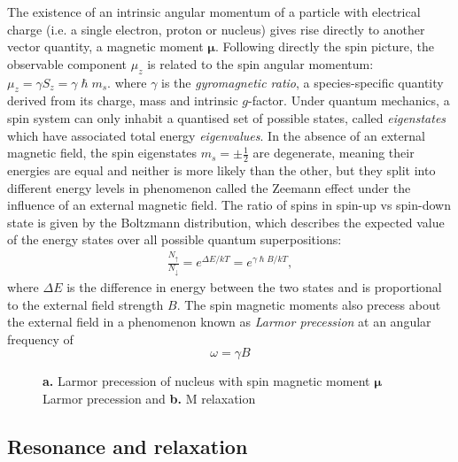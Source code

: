The existence of an intrinsic angular momentum of a particle with electrical charge (i.e. a single electron, proton or nucleus) gives rise directly to another vector quantity, a magnetic moment $\bm{\mu}$.
Following directly the spin picture, the observable component $\mu_z$ is related to the spin angular momentum: $\mu_z = \gamma S_z = \gamma \hslash m_s $.
where $\gamma$ is the \textit{gyromagnetic ratio}, a species-specific quantity derived from its charge, mass and intrinsic $g$-factor.
Under quantum mechanics, a spin system can only inhabit a quantised set of possible states, called \textit{eigenstates} which have associated total energy \textit{eigenvalues}.
In the absence of an external magnetic field, the spin eigenstates $m_s = \pm \frac{1}{2}$ are degenerate, meaning their energies are equal and neither is more likely than the other, but they split into different energy levels in phenomenon called the Zeemann effect under the influence of an external magnetic field.
The ratio of spins in spin-up vs spin-down state is given by the Boltzmann distribution, which describes the expected value of the energy states over all possible quantum superpositions:
\begin{align}
  \frac{N_{\uparrow}}{N_{\downarrow}} = e^{\Delta E / k T} = e^{\gamma \hslash B / k T}, \label{eq:boltzmann}
\end{align}
where $\Delta E$ is the difference in energy between the two states and is proportional to the external field strength $B$.
The spin magnetic moments also precess about the external field in a phenomenon known as \textit{Larmor precession} at an angular frequency of
\begin{equation}
  \omega = \gamma B
\end{equation}

\begin{figure}
    \centering
    \qquad%
    
  \caption{\textbf{a.} Larmor precession of nucleus with spin magnetic moment $\bm{\mu}$ Larmor precession and \textbf{b.} M relaxation }\label{fig:larmor}
\end{figure}

\subsection{Resonance and relaxation}

